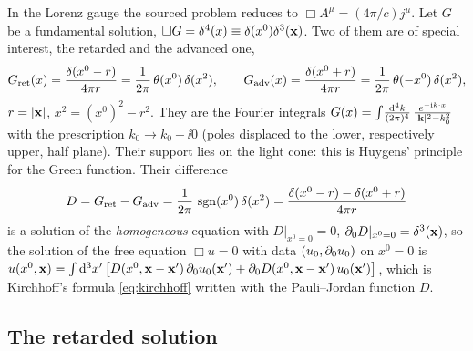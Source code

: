 In the Lorenz gauge the sourced problem reduces to $\Box A^\mu=(4\pi/c)j^\mu$.
Let $G$ be a fundamental solution, $\Box G=\delta^4(x)\equiv\delta(x^0)\delta^3(\mathbf{x})$.
Two of them are of special interest, the retarded and the advanced one,
\begin{equation}\label{eq:green}
G_{\rm ret}(x)=\frac{\delta(x^0-r)}{4\pi r}=\frac1{2\pi}\,\theta(x^0)\,\delta(x^2),\qquad
G_{\rm adv}(x)=\frac{\delta(x^0+r)}{4\pi r}=\frac1{2\pi}\,\theta(-x^0)\,\delta(x^2),
\end{equation}
$r=|\mathbf{x}|$, $x^2=(x^0)^2-r^2$.  They are the Fourier integrals
$G(x)=\int\!\frac{\mathrm{d}^4k}{(2\pi)^4}\,\frac{e^{-\mathrm{i} k\cdot x}}{|\mathbf{k}|^2-k_0^2}$ with
the prescription $k_0\to k_0\pm\ii0$ (poles displaced to the lower, respectively
upper, half plane).  Their support lies on the light cone: this is
Huygens' principle for the Green function.  Their difference
\begin{equation}
D=G_{\rm ret}-G_{\rm adv}=\frac1{2\pi}\,\operatorname{sgn}(x^0)\,\delta(x^2)
=\frac{\delta(x^0-r)-\delta(x^0+r)}{4\pi r}
\end{equation}
is a solution of the \emph{homogeneous} equation with
$D|_{x^0=0}=0$, $\partial_0D|_{x^0=0}=\delta^3(\mathbf{x})$, so the solution of the free equation
$\Box u=0$ with data $(u_0,\partial_0u_0)$ on $x^0=0$ is
$u(x^0,\mathbf{x})=\int\mathrm{d}^3x'\,\big[D(x^0,\mathbf{x}-\mathbf{x}')\,\partial_0u_0(\mathbf{x}')+\partial_0D(x^0,\mathbf{x}-\mathbf{x}')\,u_0(\mathbf{x}')\big]$,
which is Kirchhoff's formula \eqref{eq:kirchhoff} written with
the Pauli--Jordan function $D$.

\subsection{The retarded solution}

